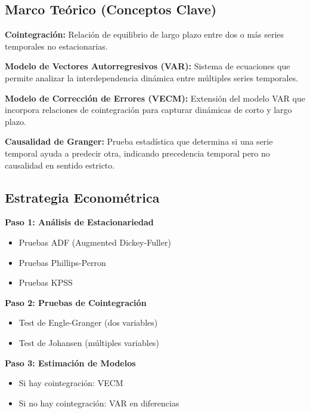 \documentclass[
  man,
  floatsintext,
  longtable,
  a4paper,
  nolmodern,
  notxfonts,
  notimes,
  12pt,
  colorlinks=true,linkcolor=blue,citecolor=blue,urlcolor=blue]{apa7}
\providecommand{\tightlist}{%
  \setlength{\itemsep}{0pt}\setlength{\parskip}{0pt}}
\begin{document}
\subsection{Marco Teórico (Conceptos
Clave)}\label{marco-teuxf3rico-conceptos-clave-4}

\textbf{Cointegración:} Relación de equilibrio de largo plazo entre dos
o más series temporales no estacionarias.

\textbf{Modelo de Vectores Autorregresivos (VAR):} Sistema de ecuaciones
que permite analizar la interdependencia dinámica entre múltiples series
temporales.

\textbf{Modelo de Corrección de Errores (VECM):} Extensión del modelo
VAR que incorpora relaciones de cointegración para capturar dinámicas de
corto y largo plazo.

\textbf{Causalidad de Granger:} Prueba estadística que determina si una
serie temporal ayuda a predecir otra, indicando precedencia temporal
pero no causalidad en sentido estricto.

\subsection{Estrategia Econométrica}\label{estrategia-economuxe9trica}

\textbf{Paso 1: Análisis de Estacionariedad}

\begin{itemize}
\tightlist
\item
  Pruebas ADF (Augmented Dickey-Fuller)
\item
  Pruebas Phillips-Perron
\item
  Pruebas KPSS
\end{itemize}

\textbf{Paso 2: Pruebas de Cointegración}

\begin{itemize}
\tightlist
\item
  Test de Engle-Granger (dos variables)
\item
  Test de Johansen (múltiples variables)
\end{itemize}

\textbf{Paso 3: Estimación de Modelos}

\begin{itemize}
\tightlist
\item
  Si hay cointegración: VECM
\item
  Si no hay cointegración: VAR en diferencias
\end{itemize}
\end{document}
